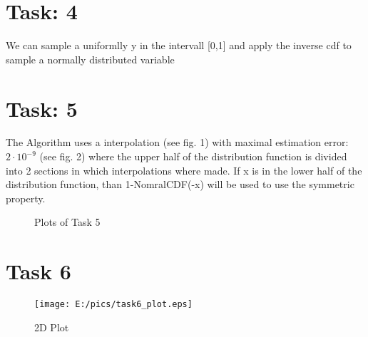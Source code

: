 \documentclass{article}
\begin{document}
\section*{Task: 4} %
We can sample a uniformlly y in the intervall [0,1] and apply the inverse cdf to sample a normally distributed variable

\newpage
\section*{Task: 5} %
The Algorithm uses a interpolation (see fig. 1) with maximal estimation error: $2\cdot 10^{-9}$ (see fig. 2) where the upper half of the distribution function is divided into 2 sections in which interpolations where made. 
If x is in the lower half of the distribution function, than 1-NomralCDF(-x) will be used to use the symmetric property.

\begin{figure} [htbp]
\caption{Plots of Task 5} 
\end{figure} 


\newpage
\section*{Task 6}
\begin{figure}[htbp]
	\centering
		\texttt{[image: E:/pics/task6\_plot.eps]}
	\caption{2D Plot}
	\label{fig:task6_plot}
\end{figure}
\end{document}
